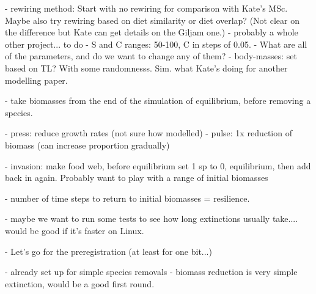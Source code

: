 - rewiring method: Start with no rewiring for comparison with Kate's MSc. Maybe also try rewiring based on diet similarity or diet overlap? (Not clear on the difference but Kate can get details on the Giljam one.)
	- probably a whole other project... to do 
- S and C ranges: 50-100, C in steps of 0.05.
- What are all of the parameters, and do we want to change any of them? 
- body-masses: set based on TL? With some randomnesss. Sim. what Kate's doing for another modelling paper. 

- take biomasses from the end of the simulation of equilibrium, before removing a species.


- press: reduce growth rates (not sure how modelled)
- pulse: 1x reduction of biomass (can increase proportion gradually)


- invasion: make food web, before equilibrium set 1 sp to 0, equilibrium, then add back in again. Probably want to play with a range of initial biomasses 


- number of time steps to return to initial biomasses = resilience. 

- maybe we want to run some tests to  see how long extinctions usually take.... would be good if it's faster on Linux. 


- Let's go for the preregistration (at least for one bit...)

	- already set up for simple species removals
	- biomass reduction is very simple extinction, would be a good first round. 







